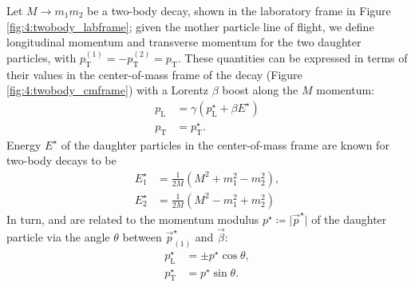 
Let $M \rightarrow m_1 m_2$ be a two-body decay, shown in the laboratory frame in Figure \ref{fig:4:twobody_labframe};
given the mother particle line of flight, we define longitudinal momentum \pl and transverse momentum \pt for the two daughter particles, with $p_\text{T}^{(1)} = - p_\text{T}^{(2)} = p_\text{T}$.
These quantities can be expressed in terms of their values in the center-of-mass frame of the decay (Figure \ref{fig:4:twobody_cmframe}) with a Lorentz $\beta$ boost along the $M$ momentum:
\begin{subequations}
\label{eq:4:ap_p_lorentz}
\begin{align}
	p_\text{L} &= \gamma \left( p_\text{L}^\star + \beta E^\star \right)
	\label{eq:4:ap_pL_lorentz} \\
	p_\text{T} &= p_\text{T}^\star.
	\label{eq:4:ap_pT_lorentz}
\end{align}
\end{subequations}
Energy $E^\star$ of the daughter particles in the center-of-mass frame are known for two-body decays to be
\begin{subequations}
\label{eq:4:ap_Estar}
\begin{align}
	E_1^\star &=
	\frac{1}{2M}
	\left(M^2 + m_1^2 - m_2^2 \right), \\
	E_2^\star &=
	\frac{1}{2M}
	\left(M^2 - m_1^2 + m_2^2 \right)
\end{align}
\end{subequations}
In turn, \plstar and \ptstar are related to the momentum modulus $p^\star \coloneqq \lvert \vec{p}^\star \rvert$ of the daughter particle via the angle $\theta$ between $\vec{p}^\star_{(1)}$ and $\vec{\beta}$:
\begin{subequations}
\label{eq:4:ap_p_theta}
\begin{align}
	p_\text{L}^\star &= \pm p^\star \cos\theta,	\label{eq:4:ap_pL_theta} \\
	p_\text{T}^\star &= p^\star \sin\theta.		\label{eq:4:ap_pT_theta}
\end{align}
\end{subequations}

